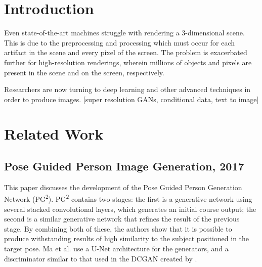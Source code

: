 \documentclass{article}
\begin{document}
\section{Introduction}
\label{sec:introduction}
Even state-of-the-art machines struggle with rendering a 3-dimensional scene. This is due to the preprocessing and processing which must occur for each artifact in the scene and every pixel of the screen. The problem is exacerbated further for high-resolution renderings, wherein millions of objects and pixels are present in the scene and on the screen, respectively.

Researchers are now turning to deep learning and other advanced techniques in order to produce images. [super resolution GANs, conditional data, text to image]

\section{Related Work}
\label{sec:related}

\subsection*{Pose Guided Person Image Generation, 2017}
\nocite{pg2}
This paper discusses the development of the Pose Guided Person Generation
Network (PG\textsuperscript{2}). PG\textsuperscript{2} contains two stages:
the first is a generative network using several stacked convolutional layers,
which generates an initial course output;
the second is a similar generative network that refines the
result of the previous stage. By combining both of these,
the authors show that it is possible to produce withstanding results of
high similarity to the subject positioned in the target pose.
Ma et al. use a U-Net architecture for the generators, and a discriminator
similar to that used in the DCGAN created by
\cite{unsupervised_representational}.
\end{document}
